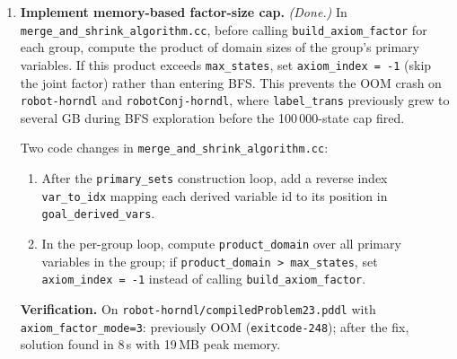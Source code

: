 \documentclass[11pt,a4paper]{article}
\begin{document}
\begin{enumerate}
    \textit{Where modes~1/2 win (18/17 instances):}
    The dominant gain is \texttt{sokoban-axioms} (10 instances for both), where
    the goal-derived axiom factors provide enough heuristic guidance to close
    solutions that mode~0 cannot find in time.
    \texttt{tpsa-horndl} (3 each) and several single-instance domains
    (\texttt{appn-adl}, \texttt{psr-large}, \texttt{robot-horndl},
    \texttt{optical-telegraphs}, \texttt{word-rooms} for mode~1;
    \texttt{elevator-horndl}, \texttt{psr-middle} for mode~2) provide the rest.

    \textit{Net:} mode-0 wins 26 and loses 18 vs.\ mode-1 ($+8$ net);
    wins 25 and loses 17 vs.\ mode-2 ($+8$ net).
    The gap is driven by OOM on \texttt{robot-horndl}/\texttt{robotConj-horndl}:
    removing those 21 OOM losses, modes~1 and~2 would \emph{outperform} mode~0
    by 13/13 instances.
    \emph{v3 confirms this:} with the memory cap, modes~1 (501) and~2 (504)
    both outperform mode~0 (489) by 12/15 instances respectively.

  \item \textbf{Implement memory-based factor-size cap.} \emph{(Done.)}
    In \texttt{merge\_and\_shrink\_algorithm.cc}, before calling
    \texttt{build\_axiom\_factor} for each group, compute the product of domain
    sizes of the group's primary variables.  If this product exceeds
    \texttt{max\_states}, set \texttt{axiom\_index = -1} (skip the joint factor)
    rather than entering BFS.  This prevents the OOM crash on
    \texttt{robot-horndl} and \texttt{robotConj-horndl}, where
    \texttt{label\_trans} previously grew to several GB during BFS exploration
    before the 100\,000-state cap fired.

    Two code changes in \texttt{merge\_and\_shrink\_algorithm.cc}:
    \begin{enumerate}
      \item After the \texttt{primary\_sets} construction loop, add a reverse
        index \texttt{var\_to\_idx} mapping each derived variable id to its
        position in \texttt{goal\_derived\_vars}.
      \item In the per-group loop, compute \texttt{product\_domain} over all
        primary variables in the group; if
        \texttt{product\_domain > max\_states}, set \texttt{axiom\_index = -1}
        instead of calling \texttt{build\_axiom\_factor}.
    \end{enumerate}

    \textbf{Verification.}  On \texttt{robot-horndl/compiledProblem23.pddl}
    with \texttt{axiom\_factor\_mode=3}: previously OOM (\texttt{exitcode-248});
    after the fix, solution found in 8\,s with 19\,MB peak memory.


\end{enumerate}
\end{document}
